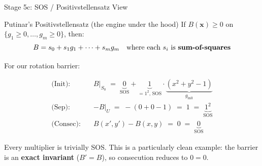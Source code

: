 \documentclass[aspectratio=169]{beamer}
\begin{document}
\begin{frame}{Stage 5c: SOS / Positivstellensatz View}
\begin{block}{Putinar's Positivstellensatz (the engine under the hood)}
If $B(\mathbf{x}) \ge 0$ on $\{g_1 \ge 0, \ldots, g_m \ge 0\}$, then:
\[
  B = s_0 + s_1 g_1 + \cdots + s_m g_m
  \quad\text{where each $s_i$ is \textbf{sum-of-squares}}
\]
\end{block}

\vspace{0.3em}
For our rotation barrier:

\begin{align}
  \text{(Init):}\quad & B\big|_{S_0} \;=\; \underbrace{0}_{\text{SOS}} +
    \underbrace{1}_{= 1^2\text{, SOS}} \cdot \underbrace{(x^2{+}y^2 - 1)}_{g_{\mathrm{init}}} \\[6pt]
  \text{(Sep):}\quad & -B\big|_{U} \;=\; -(0 + 0 - 1) \;=\; 1 \;=\; \underbrace{1^2}_{\text{SOS}} \\[6pt]
  \text{(Consec):}\quad & B(x',y') - B(x,y) \;=\; 0 \;=\; \underbrace{0}_{\text{SOS}}
\end{align}

\vspace{0.3em}
\footnotesize
Every multiplier is trivially SOS.
This is a particularly clean example: the barrier is an \textbf{exact invariant} ($B' = B$),
so consecution reduces to $0 = 0$.
\end{frame}


\end{document}
